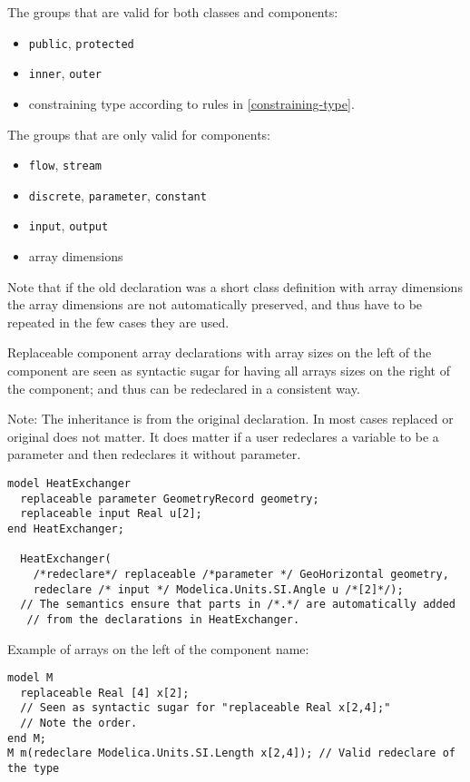 The groups that are valid for both classes and components:
\begin{itemize}
\item
  \lstinline!public!, \lstinline!protected!
\item
  \lstinline!inner!, \lstinline!outer!
\item
  constraining type according to rules in \cref{constraining-type}.
\end{itemize}

The groups that are only valid for components:
\begin{itemize}
\item
  \lstinline!flow!, \lstinline!stream!
\item
  \lstinline!discrete!, \lstinline!parameter!, \lstinline!constant!
\item
  \lstinline!input!, \lstinline!output!
\item
  array dimensions
\end{itemize}

Note that if the old declaration was a short class definition with array
dimensions the array dimensions are not automatically preserved, and
thus have to be repeated in the few cases they are used.

Replaceable component array declarations with array sizes on the left of
the component are seen as syntactic sugar for having all arrays sizes on
the right of the component; and thus can be redeclared in a consistent
way.

\begin{nonnormative}
Note: The inheritance is from the original declaration. In most
cases replaced or original does not matter. It does matter if a user
redeclares a variable to be a parameter and then redeclares it without
parameter.
\end{nonnormative}

\begin{nonnormative}
\begin{lstlisting}[language=modelica]
model HeatExchanger
  replaceable parameter GeometryRecord geometry;
  replaceable input Real u[2];
end HeatExchanger;

  HeatExchanger(
    /*redeclare*/ replaceable /*parameter */ GeoHorizontal geometry,
    redeclare /* input */ Modelica.Units.SI.Angle u /*[2]*/);
  // The semantics ensure that parts in /*.*/ are automatically added
   // from the declarations in HeatExchanger.
\end{lstlisting}

Example of arrays on the left of the component name:
\begin{lstlisting}[language=modelica]
model M
  replaceable Real [4] x[2];
  // Seen as syntactic sugar for "replaceable Real x[2,4];"
  // Note the order.
end M;
M m(redeclare Modelica.Units.SI.Length x[2,4]); // Valid redeclare of the type
\end{lstlisting}
\end{nonnormative}

